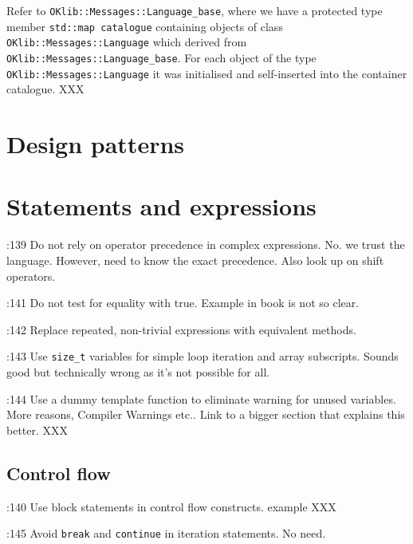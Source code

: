 \documentclass{book}
\newcommand{\name}[1]{\texttt{#1}}
\begin{document}
Refer to \name{OKlib::Messages::Language\_base}, where we have a protected type member \name{std::map catalogue} containing objects of class \name{OKlib::Messages::Language} which derived from \name{OKlib::Messages::Language\_base}. For each object of the type \name{OKlib::Messages::Language} it was initialised and self-inserted into the container catalogue. XXX




\chapter{Design patterns}
\label{cha:DesignPatterns}



\chapter{Statements and expressions}
\label{cha:Statements}

\cite{OKL_MisfeldtBumgardnerGray2004CppStyle}:139 Do not rely on operator precedence in complex expressions. No. we trust the language. However, need to know the exact precedence. Also look up on shift operators.

\cite{OKL_MisfeldtBumgardnerGray2004CppStyle}:141 Do not test for equality with true. Example in book is not so clear. 

\cite{OKL_MisfeldtBumgardnerGray2004CppStyle}:142 Replace repeated, non-trivial expressions with equivalent methods. 

\cite{OKL_MisfeldtBumgardnerGray2004CppStyle}:143 Use \name{size\_t} variables for simple loop iteration and array subscripts. Sounds good but technically wrong as it's not possible for all.

\cite{OKL_MisfeldtBumgardnerGray2004CppStyle}:144 Use a dummy template function to eliminate warning for unused variables. More reasons, Compiler Warnings etc.. Link to a bigger section that explains this better. XXX 



\section{Control flow}
\label{sec:control}

\cite{OKL_MisfeldtBumgardnerGray2004CppStyle}:140 Use block statements in control flow constructs. example XXX

\cite{OKL_MisfeldtBumgardnerGray2004CppStyle}:145 Avoid \name{break} and \name{continue} in iteration statements. No need.
\end{document}

